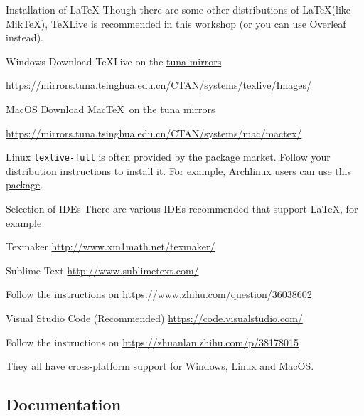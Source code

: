 \begin{frame}{Installation of \LaTeX}
    Though there are some other distributions of \LaTeX (like Mik\TeX), \TeX Live is recommended in this workshop (or you can use Overleaf instead).
    \begin{block}{Windows}
        Download \TeX Live on the \href{https://mirrors.tuna.tsinghua.edu.cn/}{tuna mirrors}
        \smallskip

        \small{\url{https://mirrors.tuna.tsinghua.edu.cn/CTAN/systems/texlive/Images/}}
    \end{block}
    \begin{block}{MacOS}
        Download Mac\TeX\ on the \href{https://mirrors.tuna.tsinghua.edu.cn/}{tuna mirrors}
        \smallskip

        \small{\url{https://mirrors.tuna.tsinghua.edu.cn/CTAN/systems/mac/mactex/}}
    \end{block}
    \begin{block}{Linux}
        \texttt{texlive-full} is often provided by the package market.
        Follow your distribution instructions to install it.
        For example, Archlinux users can use \hyperlink{https://aur.archlinux.org/packages/texlive-full}{this package}.
    \end{block}
\end{frame}

\begin{frame}{Selection of IDEs}
    There are various IDEs recommended that support \LaTeX , for example
    \begin{block}{Texmaker}
        \url{http://www.xm1math.net/texmaker/}
    \end{block}

    \begin{block}{Sublime Text}
        \url{http://www.sublimetext.com/}
    \end{block}
    Follow the instructions on \url{https://www.zhihu.com/question/36038602}

    \begin{block}{Visual Studio Code (Recommended)}
        \url{https://code.visualstudio.com/}
    \end{block}
    Follow the instructions on \url{https://zhuanlan.zhihu.com/p/38178015}
    \bigskip

    They all have cross-platform support for Windows, Linux and MacOS.
\end{frame}

\subsection{Documentation}

